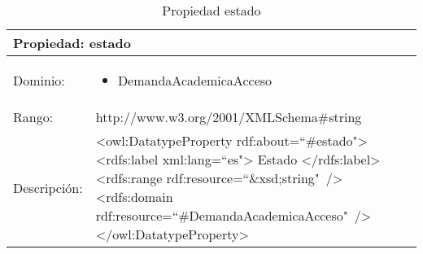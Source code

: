 \begin{table}[!ht]
	\centering
	\begin{tabular}{|p{}|p{}|}
		\hline
		\multicolumn{2}{|l|}{Propiedad: \textbf{estado}}
		\\ \hline
		Dominio:&
		\begin{itemize}
			\item DemandaAcademicaAcceso
		\end{itemize}
		\\ \hline
		Rango:&
		http://www.w3.org/2001/XMLSchema\#string
		\\ \hline
		Descripción:&
		\textless owl:DatatypeProperty rdf:about=``\#estado"\textgreater\newline 
		\tab\textless rdfs:label xml:lang=``es"\textgreater\newline
		\tab\tab Estado\newline
		\tab\textless /rdfs:label\textgreater\newline
		\tab\textless rdfs:range\newline
		\tab\tab rdf:resource=``\&xsd;string"\ /\textgreater\newline
		\tab\textless rdfs:domain\newline
		\tab\tab rdf:resource=``\#DemandaAcademicaAcceso"\ /\textgreater\newline
		\textless /owl:DatatypeProperty\textgreater
		\\ \hline
	\end{tabular}
	\caption{Propiedad estado}
	\label{propiedad-estado}
\end{table}

